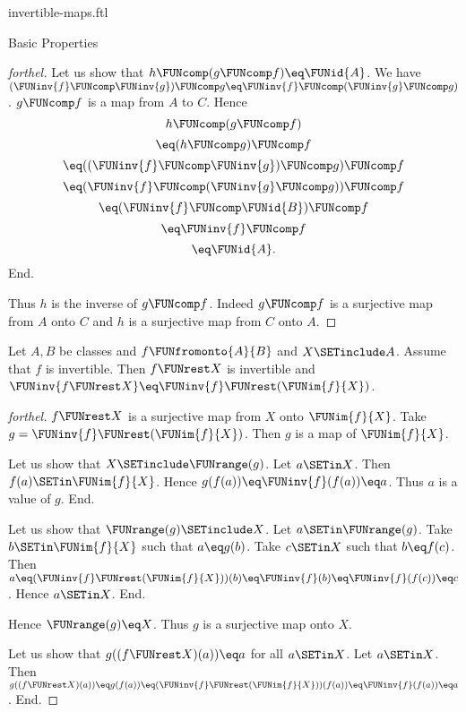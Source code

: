 \documentclass{naproche-library}
\begin{document}
\begin{smodule}[title=Invertible Maps]{invertible-maps.ftl}
\begin{sfragment}{Basic Properties}
\begin{proof}[forthel]
    Let us show that $h \FUNcomp (g \FUNcomp f) \eq \FUNid{A}$.
      We have $(\FUNinv{f} \FUNcomp \FUNinv{g}) \FUNcomp g \eq \FUNinv{f} \FUNcomp (\FUNinv{g} \FUNcomp g)$.
      $g \FUNcomp f$ is a map from $A$ to $C$.
      Hence
      \[  h \FUNcomp (g \FUNcomp f)                           \]
      \[    \eq (h \FUNcomp g) \FUNcomp f                       \]
      \[    \eq ((\FUNinv{f} \FUNcomp \FUNinv{g}) \FUNcomp g) \FUNcomp f   \]
      \[    \eq (\FUNinv{f} \FUNcomp (\FUNinv{g} \FUNcomp g)) \FUNcomp f   \]
      \[    \eq (\FUNinv{f} \FUNcomp \FUNid{B}) \FUNcomp f            \]
      \[    \eq \FUNinv{f} \FUNcomp f                            \]
      \[    \eq \FUNid{A}.                                  \]
    End.

    Thus $h$ is the inverse of $g \FUNcomp f$.
    Indeed $g \FUNcomp f$ is a surjective map from $A$ onto $C$ and $h$ is a surjective map from $C$ onto $A$.
  \end{proof}

  \begin{proposition}[forthel,id=FOUNDATIONS_09_6374884963778560]
    Let $A, B$ be classes and $f \FUNfromonto{A}{B}$ and $X \SETinclude A$.
    Assume that $f$ is invertible.
    Then $f \FUNrest X$ is invertible and $\FUNinv{f\FUNrest X} \eq \FUNinv{f} \FUNrest (\FUNim{f}{X})$.
  \end{proposition}
  \begin{proof}[forthel]
    $f \FUNrest X$ is a surjective map from $X$ onto $\FUNim{f}{X}$.
    Take $g = \FUNinv{f} \FUNrest (\FUNim{f}{X})$.
    Then $g$ is a map of $\FUNim{f}{X}$.

    Let us show that $X \SETinclude \FUNrange(g)$.
      Let $a \SETin X$.
      Then $f(a) \SETin \FUNim{f}{X}$.
      Hence $g(f(a)) \eq \FUNinv{f}(f(a)) \eq a$.
      Thus $a$ is a value of $g$.
    End.

    Let us show that $\FUNrange(g) \SETinclude X$.
      Let $a \SETin \FUNrange(g)$.
      Take $b \SETin \FUNim{f}{X}$ such that $a \eq g(b)$.
      Take $c \SETin X$ such that $b \eq f(c)$.
      Then $a
        \eq (\FUNinv{f} \FUNrest (\FUNim{f}{X}))(b)
        \eq \FUNinv{f}(b)
        \eq \FUNinv{f}(f(c))
        \eq c$.
      Hence $a \SETin X$.
    End.

    Hence $\FUNrange(g) \eq X$.
    Thus $g$ is a surjective map onto $X$.

    Let us show that $g((f \FUNrest X)(a)) \eq a$ for all $a \SETin X$.
      Let $a \SETin X$.
      Then $g((f \FUNrest X)(a))
        \eq g(f(a))
        \eq (\FUNinv{f} \FUNrest (\FUNim{f}{X}))(f(a))
        \eq \FUNinv{f}(f(a))
        \eq a$.
    End.


\end{proof}
\end{sfragment}
\end{smodule}
\end{document}
